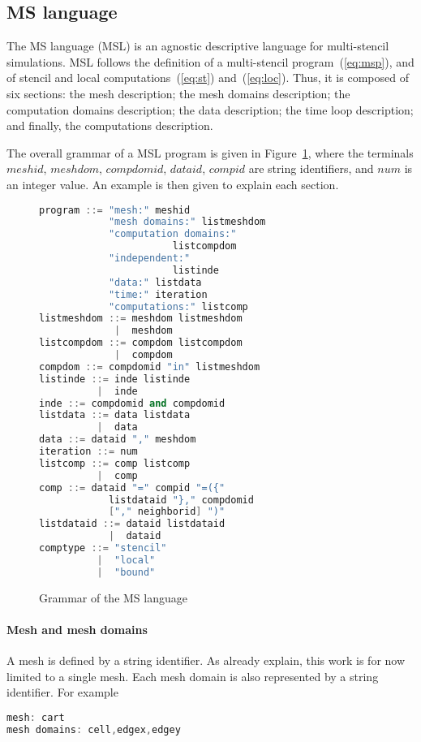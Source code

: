 \subsection{MS language}
The MS language (MSL) is an agnostic descriptive language for multi-stencil simulations. MSL follows the definition of a multi-stencil program~(\ref{eq:msp}), and of stencil and local computations~(\ref{eq:st}) and~(\ref{eq:loc}). Thus, it is composed of six sections: the mesh description; the mesh domains description; the computation domains description; the data description; the time loop description; and finally, the computations description.

The overall grammar of a MSL program is given in Figure~\ref{fig:grammar}, where the terminals $meshid$, $meshdom$, $compdomid$, $dataid$, $compid$ are string identifiers, and $num$ is an integer value. An example is then given to explain each section.

\begin{figure}[h!]
\begin{lstlisting}[basicstyle=\small,mathescape,frame=single,language=C++]
program ::= "mesh:" meshid 
            "mesh domains:" listmeshdom
            "computation domains:" 
                       listcompdom
            "independent:"
                       listinde
            "data:" listdata
            "time:" iteration
            "computations:" listcomp
listmeshdom ::= meshdom listmeshdom
             |  meshdom
listcompdom ::= compdom listcompdom
             |  compdom
compdom ::= compdomid "in" listmeshdom
listinde ::= inde listinde
          |  inde
inde ::= compdomid and compdomid
listdata ::= data listdata
          |  data
data ::= dataid "," meshdom
iteration ::= num
listcomp ::= comp listcomp
          |  comp
comp ::= dataid "=" compid "=({" 
            listdataid "}," compdomid 
            ["," neighborid] ")"
listdataid ::= dataid listdataid
            |  dataid
comptype ::= "stencil"
          |  "local"
          |  "bound"
\end{lstlisting}
\caption{Grammar of the MS language}
\label{fig:grammar}
\end{figure}

\paragraph{Mesh and mesh domains} A mesh is defined by a string identifier. As already explain, this work is for now limited to a single mesh. Each mesh domain is also represented by a string identifier. For example
\begin{lstlisting}[basicstyle=\small,mathescape,frame=single,language=C++]
mesh: cart
mesh domains: cell,edgex,edgey
\end{lstlisting}

